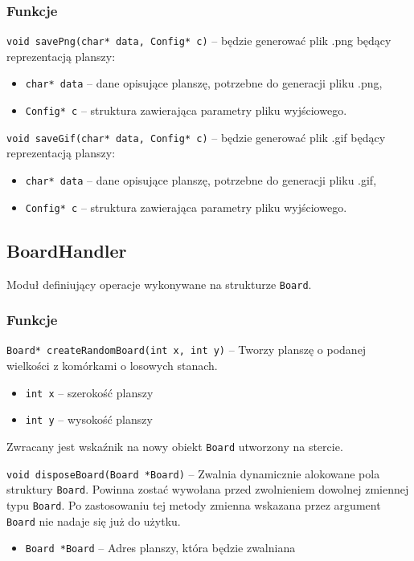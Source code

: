 \documentclass{article}
\begin{document}
\subsubsection{Funkcje}
\texttt{void savePng(char* data, Config* c)} -- będzie generować plik .png będący reprezentacją planszy:
\begin{itemize}[label={}]
	\item \texttt{char* data} -- dane opisujące planszę, potrzebne do generacji pliku .png,
	\item \texttt{Config* c} -- struktura zawierająca parametry pliku wyjściowego.
\end{itemize}
	
\noindent{}\texttt{void saveGif(char* data, Config* c)} -- będzie generować plik .gif będący reprezentacją planszy:
\begin{itemize}[label={}]
	\item \texttt{char* data} -- dane opisujące planszę, potrzebne do generacji pliku .gif,
	\item \texttt{Config* c} -- struktura zawierająca parametry pliku wyjściowego.
\end{itemize}


\subsection{BoardHandler}
Moduł definiujący operacje wykonywane na strukturze \texttt{Board}.

\subsubsection{Funkcje}

\texttt{Board* createRandomBoard(int x, int y)} -- Tworzy planszę o podanej wielkości z komórkami o losowych stanach.
\begin{itemize}[label={}]
	\item \texttt{int x} -- szerokość planszy
	\item \texttt{int y} -- wysokość planszy
\end{itemize}
Zwracany jest wskaźnik na nowy obiekt \texttt{Board} utworzony na stercie.

\vspace{5mm}
\noindent{}\texttt{void disposeBoard(Board *Board)} -- Zwalnia dynamicznie alokowane pola struktury \texttt{Board}. Powinna zostać wywołana przed zwolnieniem dowolnej zmiennej typu \texttt{Board}. Po zastosowaniu tej metody zmienna wskazana przez argument \texttt{Board} nie nadaje się już do użytku.
\begin{itemize}[label={}]
	\item \texttt{Board *Board} -- Adres planszy, która będzie zwalniana
\end{itemize}
\end{document}
